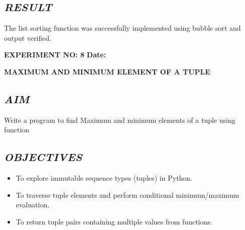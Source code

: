 \documentclass[11pt,a4paper]{article}
\begin{document}
\subsection*{\textit{RESULT}}
The list sorting function was successfully implemented using bubble sort and output verified.

\newpage

\noindent
\textbf{\large EXPERIMENT NO: 8} \hfill \textbf{\large Date: \underline{\hspace{3cm}}}

\vspace{0.2cm}
\begin{center}
{\Huge \textbf{\textcolor{navyblue}{MAXIMUM AND MINIMUM ELEMENT OF A TUPLE}}}
\end{center}
\vspace{0.3cm}

\subsection*{\textit{AIM}}
Write a program to find Maximum and minimum elements of a tuple using function

\subsection*{\textit{OBJECTIVES}}
\begin{itemize}
  \item To explore immutable sequence types (tuples) in Python.
  \item To traverse tuple elements and perform conditional minimum/maximum evaluation.
  \item To return tuple pairs containing multiple values from functions.
\end{itemize}
\end{document}
